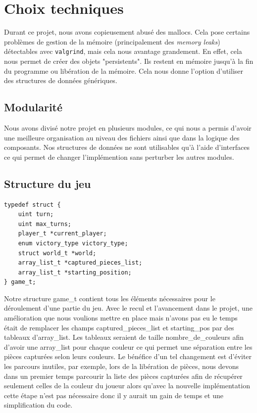 \section{Choix techniques}
Durant ce projet, nous avons copieusement abusé des mallocs. Cela pose
certains problèmes de gestion de la mémoire (principalement des \emph{memory leaks})
détectables avec \verb|valgrind|, mais cela nous avantage grandement.
En effet, cela nous permet de créer des
objets "persistents". Ils restent en mémoire jusqu'à la fin du programme
ou libération de la mémoire. Cela nous donne l'option d'utiliser des
structures de données génériques.

\subsection{Modularité}
Nous avons divisé notre projet en plusieurs modules, ce qui nous a permis d'avoir une meilleure organisation au niveau des fichiers
ainsi que dans la logique des composants. Nos structures de données ne sont utilisables qu'à l'aide d'interfaces ce qui permet de changer
l'implémention sans perturber les autres modules. 


\subsection{Structure du jeu}

\begin{verbatim}
typedef struct {
    uint turn;
    uint max_turns;
    player_t *current_player;
    enum victory_type victory_type;
    struct world_t *world;
    array_list_t *captured_pieces_list;
    array_list_t *starting_position;
} game_t;
\end{verbatim}


Notre structure game\_t contient tous les éléments nécessaires pour le déroulement d'une partie du jeu.
Avec le recul et l'avancement dans le projet, une amélioration que nous voulions mettre en place mais n'avons
pas eu le temps était de remplacer les champs captured\_pieces\_list et starting\_pos par des tableaux d'array\_list.
Les tableaux seraient de taille nombre\_de\_couleurs afin d'avoir une array\_list pour chaque couleur ce qui permet
une séparation entre les pièces capturées selon leurs couleurs. Le bénéfice d'un tel changement est 
d'éviter les parcours inutiles, par exemple, lors de la libération de pièces, nous devons dans un premier temps
parcourir la liste des pièces capturées afin de récupérer seulement celles de la couleur du joueur alors
qu'avec la nouvelle implémentation cette étape n'est pas nécessaire donc il y aurait un gain de temps et
une simplification du code.  


